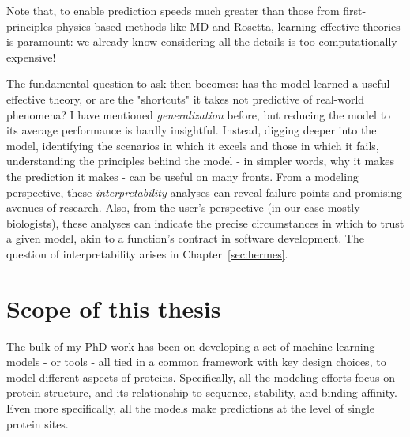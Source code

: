 Note that, to enable prediction speeds much greater than those from first-principles physics-based methods like MD and Rosetta, learning effective theories
is paramount: we already know considering all the details is too computationally expensive!

The fundamental question to ask then becomes: has the model learned a useful effective theory, or are the "shortcuts" it takes not predictive of real-world phenomena?
I have mentioned \textit{generalization} before, but reducing the model to its average performance is hardly insightful.
Instead, digging deeper into the model, identifying the scenarios in which it excels and those in which it fails, understanding the principles behind the
model - in simpler words, why it makes the prediction it makes - can be useful on many fronts.
From a modeling perspective, these \textit{interpretability} analyses can reveal failure points and promising avenues of research.
Also, from the user's perspective (in our case mostly biologists), these analyses can indicate the precise circumstances in which to trust a given model,
akin to a function's contract in software development. The question of interpretability arises in Chapter~\ref{sec:hermes}.


\section{Scope of this thesis}

The bulk of my PhD work has been on developing a set of machine learning models - or tools - all tied in a common framework with key design choices,
to model different aspects of proteins.
Specifically, all the modeling efforts focus on protein structure, and its relationship to sequence, stability, and binding affinity.
Even more specifically, all the models make predictions at the level of single protein sites. 

